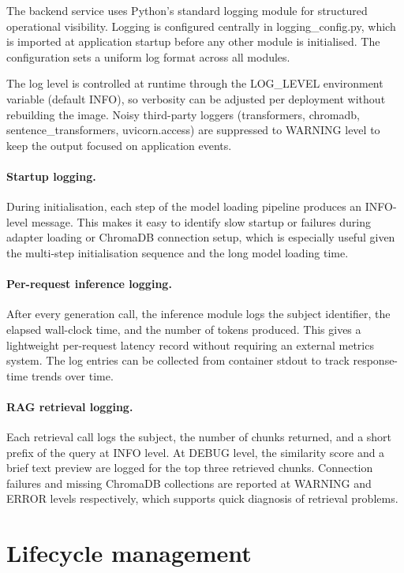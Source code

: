 The backend service uses Python's standard logging module for structured operational visibility. Logging is configured centrally in logging\_config.py, which is imported at application startup before any other module is initialised. The configuration sets a uniform log format across all modules.

The log level is controlled at runtime through the LOG\_LEVEL environment variable (default INFO), so verbosity can be adjusted per deployment without rebuilding the image. Noisy third-party loggers (transformers, chromadb, sentence\_transformers, uvicorn.access) are suppressed to WARNING level to keep the output focused on application events.

\paragraph{Startup logging.}
During initialisation, each step of the model loading pipeline produces an INFO-level message. This makes it easy to identify slow startup or failures during adapter loading or ChromaDB connection setup, which is especially useful given the multi-step initialisation sequence and the long model loading time.

\paragraph{Per-request inference logging.}
After every generation call, the inference module logs the subject identifier, the elapsed wall-clock time, and the number of tokens produced. This gives a lightweight per-request latency record without requiring an external metrics system. The log entries can be collected from container stdout to track response-time trends over time.

\paragraph{RAG retrieval logging.}
Each retrieval call logs the subject, the number of chunks returned, and a short prefix of the query at INFO level. At DEBUG level, the similarity score and a brief text preview are logged for the top three retrieved chunks. Connection failures and missing ChromaDB collections are reported at WARNING and ERROR levels respectively, which supports quick diagnosis of retrieval problems.


\section{Lifecycle management}


